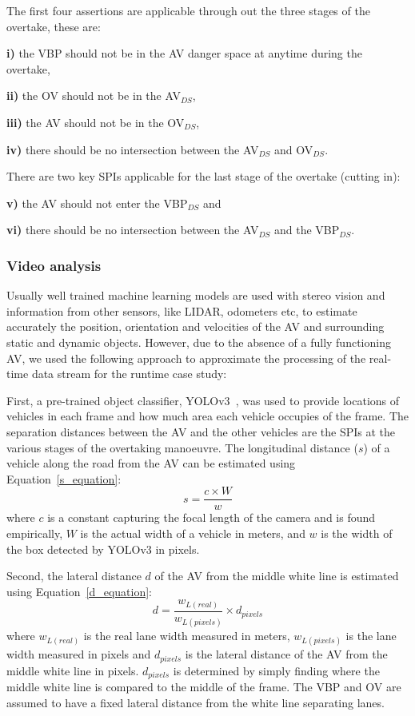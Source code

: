 The first four assertions are applicable through out the three stages of the overtake, these are:

\noindent \textbf{i)} the VBP should not be in the AV danger space at anytime during the overtake, 

\noindent \textbf{ii)} the OV should not be in the AV$_{DS}$, 

\noindent \textbf{iii)} the AV should not be in the OV$_{DS}$, 

\noindent \textbf{iv)} there should be no intersection between the AV$_{DS}$ and OV$_{DS}$.

There are two key SPIs applicable for the last stage of the overtake (cutting in):

\noindent \textbf{v)} the AV should not enter the VBP$_{DS}$ and 

\noindent \textbf{vi)} there should be no intersection between the AV$_{DS}$ and the VBP$_{DS}$. 

\subsubsection{Video analysis}
%
Usually well trained machine learning models are used with stereo vision and information from other sensors, like LIDAR, odometers etc, to estimate accurately the position, orientation and velocities of the AV and surrounding static and dynamic objects.
%
However, due to the absence of a fully functioning AV, we used the following approach to approximate the processing of the real-time data stream for the runtime case study:

First, a pre-trained object classifier, YOLOv3~\cite{Yolo}, was used to provide locations of vehicles in each frame and how much area each vehicle occupies of the frame. 
%
The separation distances between the AV and the other vehicles are the SPIs at the various stages of the overtaking manoeuvre. 
%
The longitudinal distance ($s$) of a vehicle along the road from the AV can be estimated 
using Equation~\ref{s_equation}:
\begin{equation}\label{s_equation}
    s = \frac{c\times W}{w}
\end{equation}
where $c$ is a constant capturing the focal length of the camera and is found empirically, $W$ is the actual width of a vehicle in meters, and $w$ is the width of the box detected by YOLOv3 in pixels.

Second, the lateral distance $d$ of the AV from the middle white line is estimated using Equation~\ref{d_equation}: 
%
\begin{equation}\label{d_equation}
    d = \frac{w_{L (real)}}{w_{L (pixels)}} \times d_{pixels}
\end{equation}
%
where $w_{L (real)}$ is the real lane width measured in meters, $w_{L (pixels)}$ is the lane width measured in pixels and $d_{pixels}$ is the lateral distance of the AV from the middle white line in pixels. 
%
$d_{pixels}$ is determined by simply finding where the middle white line is compared to the middle of the frame. 
%
The VBP and OV are assumed to have a fixed lateral distance from the white line separating lanes.

